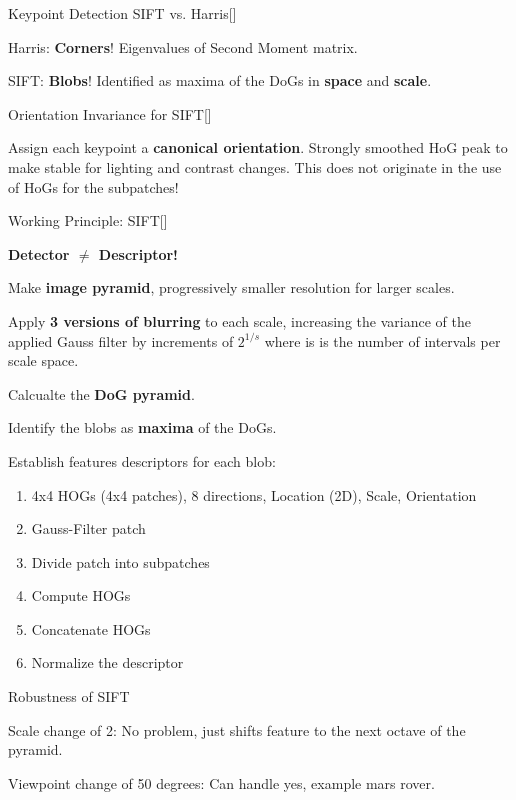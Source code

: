 \documentclass[10pt,a4paper]{scrartcl}
\begin{document}
\begin{multicols*}{2}
\begin{QandA}
{Keypoint Detection SIFT vs. Harris}[\Comparison]
\item Harris: \textbf{Corners}! Eigenvalues of Second Moment matrix.
\item SIFT: \textbf{Blobs}! Identified as maxima of the DoGs in \textbf{space} and \textbf{scale}.
\end{QandA}

\begin{QandA}
{Orientation Invariance for SIFT}[\Application]
\item Assign each keypoint a \textbf{canonical orientation}. Strongly smoothed HoG peak to make stable for lighting and contrast changes. This does not originate in the use of HoGs for the subpatches!
\end{QandA}

\begin{QandA}
{Working Principle: SIFT}[\Derivation]
\item \textbf{Detector $\neq$ Descriptor!}
\item Make \textbf{image pyramid}, progressively smaller resolution for larger scales.
\item Apply \textbf{3 versions of blurring} to each scale, increasing the variance of the applied Gauss filter by increments of $2^{1/s}$ where is is the number of intervals per scale space.
\item Calcualte the \textbf{DoG pyramid}.
\item Identify the blobs as \textbf{maxima} of the DoGs.
\item Establish features descriptors for each blob:
\begin{enumerate}
\item 4x4 HOGs (4x4 patches), 8 directions, Location (2D), Scale, Orientation
\item Gauss-Filter patch
\item Divide patch into subpatches
\item Compute HOGs
\item Concatenate HOGs
\item Normalize the descriptor
\end{enumerate}
\end{QandA}   

\begin{QandA}
{Robustness of SIFT}
\item Scale change of 2: No problem, just shifts feature to the next octave of the pyramid.
\item Viewpoint change of 50 degrees: Can handle yes, example mars rover.
\end{QandA} 


\end{multicols*}
\end{document}
